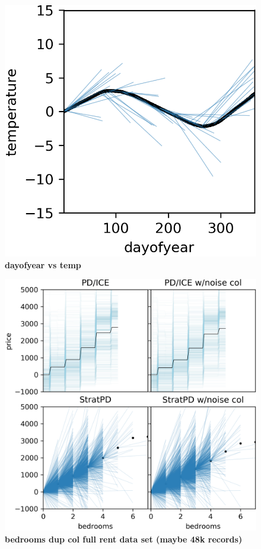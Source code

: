 \documentclass[12pt]{article}
\begin{document}
\begin{figure}[htbp]
\begin{center}
\includegraphics[scale=0.7]{images/dayofyear_vs_temp_stratpd.png}
\caption{{\bf  dayofyear  vs temp}}
\label{fig:dayofyear_vs_temp}
\end{center}
\end{figure}

\begin{figure}[htbp]
\begin{center}
\includegraphics[scale=0.6]{images/bedrooms_vs_price_noise.png}
\caption{{\bf  bedrooms dup col full rent data set (maybe 48k records)}}
\label{fig:beds_dup}
\end{center}
\end{figure}
\end{document}
